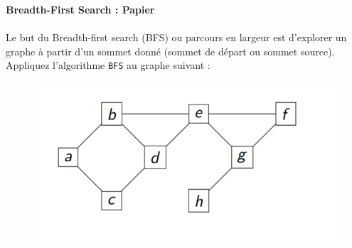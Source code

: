 \begin{Exercice}[5 minutes]\textbf{Breadth-First Search : Papier
}\\
\\
	Le but du Breadth-first search (BFS) ou parcours en largeur est d'explorer un graphe à partir d’un sommet donné (sommet de départ ou sommet source). \\

	Appliquez l’algorithme \lstinline{BFS} au graphe suivant :\\

	\begin{figure}[h!]
        		\centering
       	 	\includegraphics[]{resources/exerciceBFS.png}
	\end{figure}



\end{Exercice}
